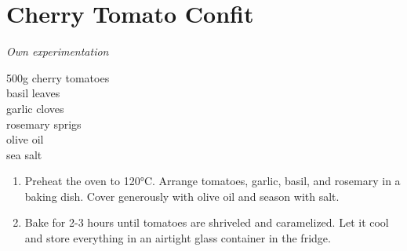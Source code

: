 \documentclass{report}
\begin{document}
\section{Cherry Tomato Confit}
\textit{Own experimentation}\\
\begin{minipage}[t]{0.21\textwidth} \vspace{0pt} \raggedright
500g cherry tomatoes\\
basil leaves\\
garlic cloves\\
rosemary sprigs\\
olive oil\\
sea salt
\end{minipage}
\hfill
\begin{minipage}[t]{0.78\textwidth} \vspace{0pt}
	\begin{enumerate}
		\item Preheat the oven to 120°C. Arrange tomatoes, garlic, basil, and rosemary in a baking dish. Cover generously with olive oil and season with salt.
		\item Bake for 2-3 hours until tomatoes are shriveled and caramelized. Let it cool and store everything in an airtight glass container in the fridge.
	\end{enumerate}	
\end{minipage}


\renewcommand{\indexname}{RECIPES A-Z}
\printindex
\end{document}
